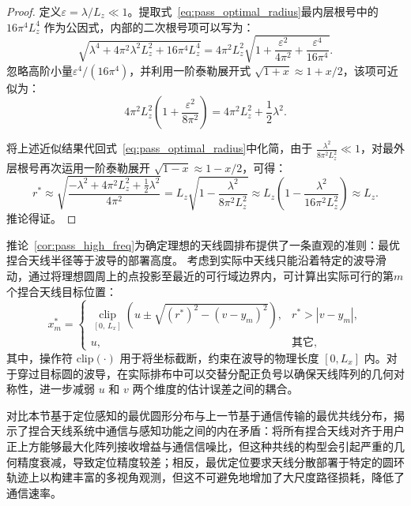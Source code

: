 \begin{proof}
	定义$\varepsilon = \lambda/L_z \ll 1$。提取式~\eqref{eq:pass_optimal_radius}最内层根号中的 $16\pi^4 L_z^4$ 作为公因式，内部的二次根号项可以写为：
	\begin{equation}
		\sqrt{ \lambda^4 + 4\pi^2 \lambda^2 L_z^2 + 16\pi^4 L_z^4 } = 4\pi^2 L_z^2 \sqrt{ 1 + \frac{\varepsilon^2}{4\pi^2} + \frac{\varepsilon^4}{16\pi^4} }.
	\end{equation}
	忽略高阶小量$\varepsilon^4/(16\pi^4)$，并利用一阶泰勒展开式 $\sqrt{1+x} \approx 1 + x/2$，该项可近似为：
	\begin{equation}
		4\pi^2 L_z^2 \left( 1 + \frac{\varepsilon^2}{8\pi^2} \right) = 4\pi^2 L_z^2 + \frac{1}{2}\lambda^2.
	\end{equation}

	将上述近似结果代回式~\eqref{eq:pass_optimal_radius}中化简，由于 $\frac{\lambda^2}{8\pi^2 L_z^2} \ll 1$，对最外层根号再次运用一阶泰勒展开 $\sqrt{1-x} \approx 1 - x/2$，可得：
	\begin{equation}
		r^\ast \approx \sqrt{ \frac{-\lambda^2 + 4\pi^2 L_z^2 + \frac{1}{2}\lambda^2}{4\pi^2} } = L_z \sqrt{ 1 - \frac{\lambda^2}{8\pi^2 L_z^2} } \approx L_z \left( 1 - \frac{\lambda^2}{16\pi^2 L_z^2} \right) \approx L_z.
	\end{equation}
	推论得证。
\end{proof}

推论~\ref{cor:pass_high_freq}为确定理想的天线圆排布提供了一条直观的准则：最优捏合天线半径等于波导的部署高度。
考虑到实际中天线只能沿着特定的波导滑动，通过将理想圆周上的点投影至最近的可行域边界内，可计算出实际可行的第$m$个捏合天线目标位置：
\begin{equation}\label{eq:pass_xm_clip}
	x_m^\ast = 
	\begin{cases}
		\mathop{\mathrm{clip}}\limits_{[0,\,L_x]}\!\left( u \pm \sqrt{(r^\ast)^2 - (v - y_m)^2} \right), & r^\ast > |v - y_m|, \\
		u, & \text{其它},
	\end{cases}
\end{equation}
其中，操作符 $\mathrm{clip}(\cdot)$ 用于将坐标截断，约束在波导的物理长度 $[0, L_x]$ 内。对于穿过目标圆的波导，在实际排布中可以交替分配正负号以确保天线阵列的几何对称性，进一步减弱 $u$ 和 $v$ 两个维度的估计误差之间的耦合。

对比本节基于定位感知的最优圆形分布与上一节基于通信传输的最优共线分布，揭示了捏合天线系统中通信与感知功能之间的内在矛盾：将所有捏合天线对齐于用户正上方能够最大化阵列接收增益与通信信噪比，但这种共线的构型会引起严重的几何精度衰减，导致定位精度较差；相反，最优定位要求天线分散部署于特定的圆环轨迹上以构建丰富的多视角观测，但这不可避免地增加了大尺度路径损耗，降低了通信速率。

